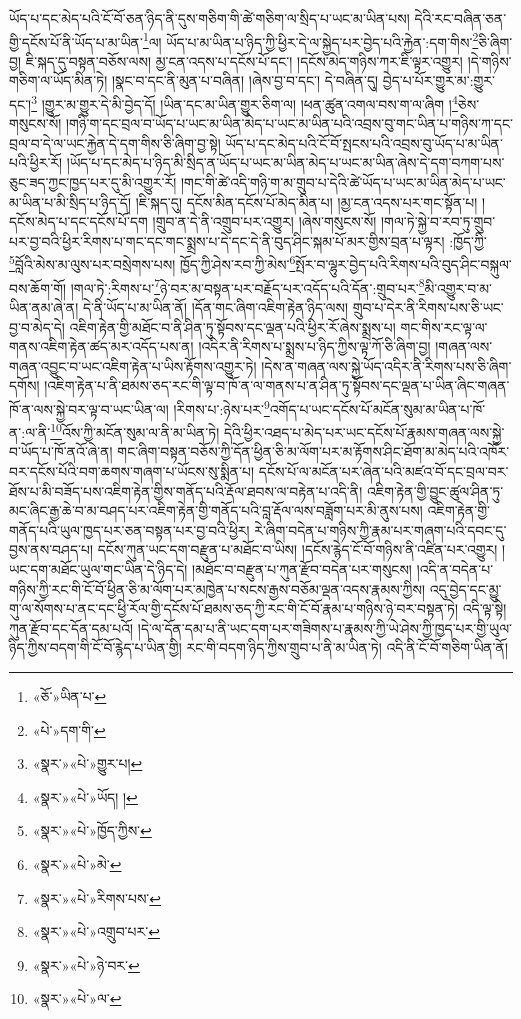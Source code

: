 ཡོད་པ་དང་མེད་པའི་ངོ་བོ་ཅན་ཉིད་ནི་དུས་གཅིག་གི་ཚེ་གཅིག་ལ་སྲིད་པ་ཡང་མ་ཡིན་པས། དེའི་རང་བཞིན་ཅན་གྱི་དངོས་པོ་ནི་ཡོད་པ་མ་ཡིན་\footnote{«ཅོ་»ཡིན་པ་}ལ། ཡོད་པ་མ་ཡིན་པ་ཉིད་ཀྱི་ཕྱིར་དེ་ལ་སྐྱེད་པར་བྱེད་པའི་རྐྱེན་:དག་གིས་\footnote{«པེ་»དག་གི་}ཅི་ཞིག་བྱ། ཇི་སྐད་དུ་བསྟན་བཅོས་ལས། མྱ་ངན་འདས་པ་དངོས་པོ་དང་། །དངོས་མེད་གཉིས་ཀར་ཇི་ལྟར་འགྱུར། །དེ་གཉིས་གཅིག་ལ་ཡོད་མིན་ཏེ། །སྣང་བ་དང་ནི་མུན་པ་བཞིན། །ཞེས་བྱ་བ་དང་། དེ་བཞིན་དུ། བྱེད་པ་པོར་གྱུར་མ་:གྱུར་དང་།\footnote{«སྣར་»«པེ་»གྱུར་པ།} །གྱུར་མ་གྱུར་དེ་མི་བྱེད་དོ། །ཡིན་དང་མ་ཡིན་གྱུར་ཅིག་ལ། །ཕན་ཚུན་འགལ་བས་ག་ལ་ཞིག །\footnote{«སྣར་»«པེ་»ཡོད། །}ཅེས་གསུངས་སོ། །གཉི་ག་དང་བྲལ་བ་ཡོད་པ་ཡང་མ་ཡིན་མེད་པ་ཡང་མ་ཡིན་པའི་འབྲས་བུ་གང་ཡིན་པ་གཉིས་ཀ་དང་བྲལ་བ་དེ་ལ་ཡང་རྐྱེན་དེ་དག་གིས་ཅི་ཞིག་བྱ་སྟེ། ཡོད་པ་དང་མེད་པའི་ངོ་བོ་སྤངས་པའི་འབྲས་བུ་ཡོད་པ་མ་ཡིན་པའི་ཕྱིར་རོ། །ཡོད་པ་དང་མེད་པ་ཉིད་མི་སྲིད་ན་ཡོད་པ་ཡང་མ་ཡིན་མེད་པ་ཡང་མ་ཡིན་ཞེས་དེ་དག་བཀག་པས་ཅུང་ཟད་ཀྱང་ཁྱད་པར་དུ་མི་འགྱུར་རོ། །གང་གི་ཚེ་འདི་གཉི་ག་མ་གྲུབ་པ་དེའི་ཚེ་ཡོད་པ་ཡང་མ་ཡིན་མེད་པ་ཡང་མ་ཡིན་པ་མི་སྲིད་པ་ཉིད་དོ། །ཇི་སྐད་དུ། དངོས་མིན་དངོས་པོ་མེད་མིན་པ། །མྱ་ངན་འདས་པར་གང་སྟོན་པ། །དངོས་མེད་པ་དང་དངོས་པོ་དག །གྲུབ་ན་དེ་ནི་འགྲུབ་པར་འགྱུར། །ཞེས་གསུངས་སོ། །གལ་ཏེ་སྐྱེ་བ་རབ་ཏུ་གྲུབ་པར་བྱ་བའི་ཕྱིར་རིགས་པ་གང་དང་གང་སྨྲས་པ་དེ་དང་དེ་ནི་བུད་ཤིང་སྐམ་པོ་མར་གྱིས་བྲན་པ་ལྟར། :ཁྱོད་ཀྱི་\footnote{«སྣར་»«པེ་»ཁྱོད་ཀྱིས་}བློའི་མེས་མ་ལུས་པར་བསྲེགས་པས། ཁྱོད་ཀྱི་ཤེས་རབ་ཀྱི་མེས་\footnote{«སྣར་»«པེ་»མེ་}སྤོར་བ་ལྷུར་བྱེད་པའི་རིགས་པའི་བུད་ཤིང་བསྐུལ་བས་ཆོག་གོ། །གལ་ཏེ་:རིགས་པ་\footnote{«སྣར་»«པེ་»རིགས་པས་}ཉེ་བར་མ་བསྟན་པར་བརྗོད་པར་འདོད་པའི་དོན་:གྲུབ་པར་\footnote{«སྣར་»«པེ་»འགྲུབ་པར་}མི་འགྱུར་བ་མ་ཡིན་ནམ་ཞེ་ན། དེ་ནི་ཡོད་པ་མ་ཡིན་ནོ། །དོན་གང་ཞིག་འཇིག་རྟེན་ཉིད་ལས། གྲུབ་པ་དེར་ནི་རིགས་པས་ཅི་ཡང་བྱ་བ་མེད་དེ། འཇིག་རྟེན་གྱི་མཐོང་བ་ནི་ཤིན་ཏུ་སྟོབས་དང་ལྡན་པའི་ཕྱིར་རོ་ཞེས་སྨྲས་པ། གང་གིས་རང་ལྟ་ལ་གནས་འཇིག་རྟེན་ཚད་མར་འདོད་པས་ན། །འདིར་ནི་རིགས་པ་སྨྲས་པ་ཉིད་ཀྱིས་ལྟ་ཀོ་ཅི་ཞིག་བྱ། །གཞན་ལས་གཞན་འབྱུང་བ་ཡང་འཇིག་རྟེན་པ་ཡིས་རྟོགས་འགྱུར་ཏེ། །དེས་ན་གཞན་ལས་སྐྱེ་ཡོད་འདིར་ནི་རིགས་པས་ཅི་ཞིག་དགོས། །འཇིག་རྟེན་པ་ནི་ཐམས་ཅད་རང་གི་ལྟ་བ་ཁོ་ན་ལ་གནས་པ་ན་ཤིན་ཏུ་སྟོབས་དང་ལྡན་པ་ཡིན་ཞིང་གཞན་ཁོ་ན་ལས་སྐྱེ་བར་ལྟ་བ་ཡང་ཡིན་ལ། །རིགས་པ་:ཉེས་པར་\footnote{«སྣར་»«པེ་»ཉེ་བར་}འགོད་པ་ཡང་དངོས་པོ་མངོན་སུམ་མ་ཡིན་པ་ཁོ་ན་:ལ་ནི་\footnote{«སྣར་»«པེ་»ལ་}འོས་ཀྱི་མངོན་སུམ་ལ་ནི་མ་ཡིན་ཏེ། དེའི་ཕྱིར་འཐད་པ་མེད་པར་ཡང་དངོས་པོ་རྣམས་གཞན་ལས་སྐྱེ་བ་ཡོད་པ་ཁོ་ནའོ་ཞེ་ན། གང་ཞིག་བསྟན་བཅོས་ཀྱི་དོན་ཕྱིན་ཅི་མ་ལོག་པར་མ་རྟོགས་ཤིང་ཐོག་མ་མེད་པའི་འཁོར་བར་དངོས་པོའི་བག་ཆགས་གཞག་པ་ཡོངས་སུ་སྨིན་པ། དངོས་པོ་ལ་མངོན་པར་ཞེན་པའི་མཛའ་བོ་དང་བྲལ་བར་ཐོས་པ་མི་བཟོད་པས་འཇིག་རྟེན་གྱིས་གནོད་པའི་རྡོལ་ཐབས་ལ་བརྟེན་པ་འདི་ནི། འཇིག་རྟེན་གྱི་བྱུང་ཚུལ་ཤིན་ཏུ་མང་ཞིང་རྒྱ་ཆེ་བ་མ་བཤད་པར་འཇིག་རྟེན་གྱི་གནོད་པའི་བླ་རྡོལ་ལས་བཟློག་པར་མི་ནུས་པས། འཇིག་རྟེན་གྱི་གནོད་པའི་ཡུལ་ཁྱད་པར་ཅན་བསྟན་པར་བྱ་བའི་ཕྱིར། རེ་ཞིག་བདེན་པ་གཉིས་ཀྱི་རྣམ་པར་གཞག་པའི་དབང་དུ་བྱས་ནས་བཤད་པ། དངོས་ཀུན་ཡང་དག་བརྫུན་པ་མཐོང་བ་ཡིས། །དངོས་རྙེད་ངོ་བོ་གཉིས་ནི་འཛིན་པར་འགྱུར། །ཡང་དག་མཐོང་ཡུལ་གང་ཡིན་དེ་ཉིད་དེ། །མཐོང་བ་བརྫུན་པ་ཀུན་རྫོབ་བདེན་པར་གསུངས། །འདི་ན་བདེན་པ་གཉིས་ཀྱི་རང་གི་ངོ་བོ་ཕྱིན་ཅི་མ་ལོག་པར་མཁྱེན་པ་སངས་རྒྱས་བཅོམ་ལྡན་འདས་རྣམས་ཀྱིས། འདུ་བྱེད་དང་མྱུ་གུ་ལ་སོགས་པ་ནང་དང་ཕྱི་རོལ་གྱི་དངོས་པོ་ཐམས་ཅད་ཀྱི་རང་གི་ངོ་བོ་རྣམ་པ་གཉིས་ཉེ་བར་བསྟན་ཏེ། འདི་ལྟ་སྟེ། ཀུན་རྫོབ་དང་དོན་དམ་པའོ། །དེ་ལ་དོན་དམ་པ་ནི་ཡང་དག་པར་གཟིགས་པ་རྣམས་ཀྱི་ཡེ་ཤེས་ཀྱི་ཁྱད་པར་གྱི་ཡུལ་ཉིད་ཀྱིས་བདག་གི་ངོ་བོ་རྙེད་པ་ཡིན་གྱི། རང་གི་བདག་ཉིད་ཀྱིས་གྲུབ་པ་ནི་མ་ཡིན་ཏེ། འདི་ནི་ངོ་བོ་གཅིག་ཡིན་ནོ། 